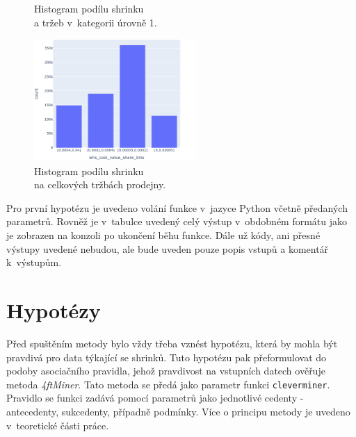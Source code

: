 \begin{figure}[h!]
\begin{minipage}[b]{.55\textwidth}
        \vspace*{-3em}
        \caption{Histogram podílu shrinku \\a tržeb v~kategorii úrovně 1.}
        \label{obr:nb:hist4}
    \end{minipage}     
       \vspace*{-1em}
\end{figure}

\begin{figure}[h!]
        \centering
        \captionsetup{justification=centering}
        \includegraphics[width=0.55\textwidth]{obrazky/grafy/histogram/newplot(4).png}
        \caption{Histogram podílu shrinku \\na celkových tržbách prodejny.}
        \label{obr:nb:hist5}
        \vspace*{-1em}
\end{figure}

Pro první hypotézu je uvedeno volání funkce v~jazyce Python včetně předaných parametrů. Rovněž je v~tabulce uvedený celý výstup v~obdobném formátu jako je zobrazen na konzoli po ukončení běhu funkce. Dále už kódy, ani přesné výstupy uvedené nebudou, ale bude uveden pouze popis vstupů a komentář k~výstupům. 

\newpage

\section{Hypotézy}
\label{sec:hypo}
Před spuštěním metody bylo vždy třeba vznést hypotézu, která by mohla být pravdivá pro data týkající se shrinků. Tuto hypotézu pak přeformulovat do podoby asociačního pravidla, jehož pravdivost  na vstupních datech ověřuje metoda \emph{4ftMiner}. Tato metoda se předá jako parametr funkci \texttt{cleverminer}. Pravidlo se funkci zadává pomocí parametrů jako jednotlivé cedenty - antecedenty, sukcedenty, případně podmínky. Více o principu metody je uvedeno v~teoretické části práce.

